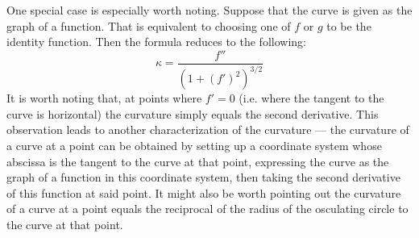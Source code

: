 \documentclass[12pt]{article}
\begin{document}
One special case is especially worth noting.  Suppose that the curve is given as the graph of a function.  That is equivalent to choosing one of $f$ or $g$ to be the identity function.  Then the formula reduces to the following:
 \[ \kappa = \frac{f''}{\left( 1 + (f')^2 \right)^{3/2}} \]
It is worth noting that, at points where $f' = 0$ (i.e. where the tangent to the curve is horizontal) the curvature simply equals the second derivative.  This observation leads to another characterization of the curvature --- the curvature of a curve at a point can be obtained by setting up a coordinate system whose abscissa is the tangent to the curve at that point, expressing the curve as the graph of a function in this coordinate system, then taking the second derivative of this function at said point.  It might also be worth pointing out the curvature of a curve at a point equals the reciprocal of the radius of the osculating circle to the curve at that point.
\end{document}
